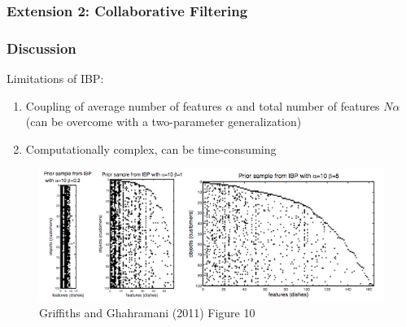\documentclass[13pt]{beamer}
\begin{document}
\begin{frame}
\frametitle{Extension 2: Collaborative Filtering}
\end{frame}
\begin{frame}
\frametitle{Discussion}


Limitations of IBP:
\begin{enumerate}
\item Coupling of average number of features $\alpha$ and total number of features $N\alpha$ (can be overcome with a two-parameter generalization)
\item Computationally complex, can be time-consuming
\end{enumerate}

\begin{figure}
\begin{center}
\includegraphics[scale=0.3]{./img/two-parameter-ibp.png}
\caption{Griffiths and Ghahramani (2011) Figure 10}
\end{center}
\end{figure}

\end{frame}
 
\end{document}
